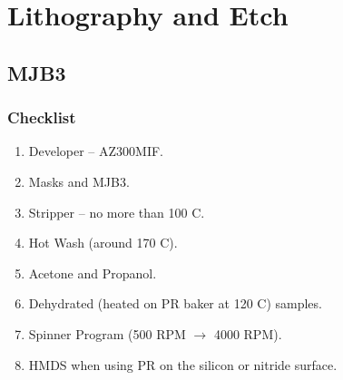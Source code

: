 
\section{Lithography and Etch}
\subsection{MJB3}
\subsubsection{Checklist}
\begin{enumerate}
\item Developer -- AZ300MIF.
\item Masks and MJB3.
\item Stripper -- no more than 100 C.
\item Hot Wash (around 170 C).
\item Acetone and Propanol.
\item Dehydrated (heated on PR baker at 120 C) samples.
\item Spinner Program (500 RPM $\rightarrow$ 4000 RPM).
\item HMDS when using PR on the silicon or nitride surface.
\end{enumerate}
